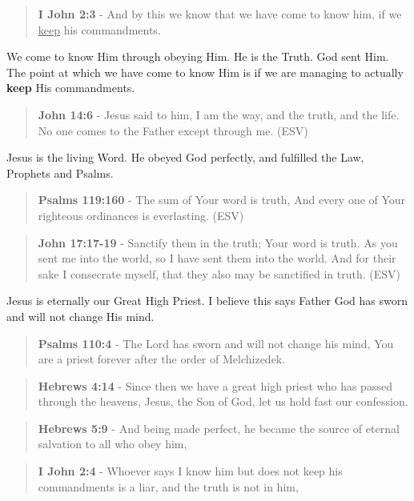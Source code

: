 \documentclass[11pt]{article}
\begin{document}
\begin{quote}
\textbf{I John 2:3} - And by this we know that we have come to know him, if we \uline{keep} his commandments.
\end{quote}

We come to know Him through obeying Him. He is the Truth. God sent Him.
The point at which we have come to know Him is if we are managing to actually \textbf{keep} His commandments.

\begin{quote}
\textbf{John 14:6} - Jesus said to him, I am the way, and the truth, and the life. No one comes to the Father except through me. (ESV)
\end{quote}

Jesus is the living Word. He obeyed God perfectly, and fulfilled the Law, Prophets and Psalms.

\begin{quote}
\textbf{Psalms 119:160} - The sum of Your word is truth, And every one of Your righteous ordinances is everlasting. (ESV)
\end{quote}

\begin{quote}
\textbf{John 17:17-19} - Sanctify them in the truth; Your word is truth. As you sent me into the world, so I have sent them into the world. And for their sake I consecrate myself, that they also may be sanctified in truth.  (ESV)
\end{quote}

Jesus is eternally our Great High Priest. I believe this says Father God has sworn and will not change His mind.

\begin{quote}
\textbf{Psalms 110:4} - The Lord has sworn and will not change his mind, You are a priest forever after the order of Melchizedek.
\end{quote}

\begin{quote}
\textbf{Hebrews 4:14} - Since then we have a great high priest who has passed through the heavens, Jesus, the Son of God, let us hold fast our confession.
\end{quote}

\begin{quote}
\textbf{Hebrews 5:9} - And being made perfect, he became the source of eternal salvation to all who obey him,
\end{quote}

\begin{quote}
\textbf{I John 2:4} - Whoever says I know him but does not keep his commandments is a liar, and the truth is not in him,
\end{quote}
\end{document}
